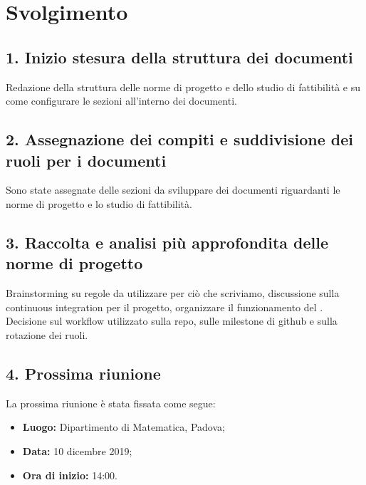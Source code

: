 \newpage
\section*{Svolgimento}

\subsection*{1. Inizio stesura della struttura dei documenti }

Redazione della struttura delle norme di progetto e dello studio di fattibilità e su come configurare le sezioni all'interno dei documenti.

\subsection*{2. Assegnazione dei compiti e suddivisione dei ruoli per i documenti }

Sono state assegnate delle sezioni da sviluppare dei documenti riguardanti le norme di progetto e lo studio di fattibilità.

\subsection*{3. Raccolta e analisi più approfondita delle norme di progetto }

Brainstorming su regole da utilizzare per ciò che scriviamo, discussione sulla continuous integration per il progetto, organizzare il funzionamento del . Decisione sul workflow utilizzato sulla repo, sulle milestone di github e sulla rotazione dei ruoli.

\subsection*{4. Prossima riunione}

La prossima riunione è stata fissata come segue:
\begin{itemize}
	\item \textbf{Luogo:} Dipartimento di Matematica, Padova;
	\item \textbf{Data:} 10 dicembre 2019;
	\item \textbf{Ora di inizio:} 14:00.
\end{itemize}
